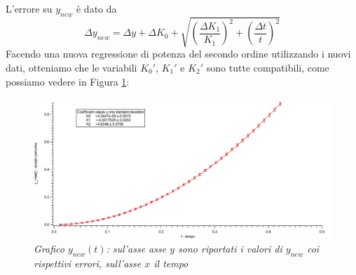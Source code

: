 \documentclass[12pt, a4paper]{article}
\begin{document}
L'errore su  $y_{new}$ è dato da
\begin{equation*}
 \Delta y_{new} = \Delta y + \Delta K_0 + \sqrt{\left(\frac{\Delta K_1}{K_1}\right)^2 + \left(\frac{\Delta t}{t}\right)^2}
 \end{equation*}
Facendo una nuova regressione di potenza del secondo ordine utilizzando i nuovi dati, otteniamo che le variabili $K_0'$, $K_1'$ e $K_2'$ sono tutte compatibili, come possiamo vedere in Figura \ref{Grafico parabolico}:
\bigskip
\bigskip

    \begin{figure}[h]
\centering
\includegraphics[width=170mm]{Immagini/Graph1.jpg}
\caption{\textit{{\footnotesize{Grafico $y_{new}(t)$: sul'asse asse $y$ sono riportati i valori di $y_{new}$ coi rispettivi errori, sull'asse $x$ il tempo}}}}
\label{Grafico parabolico}
\end{figure}
\end{document}
